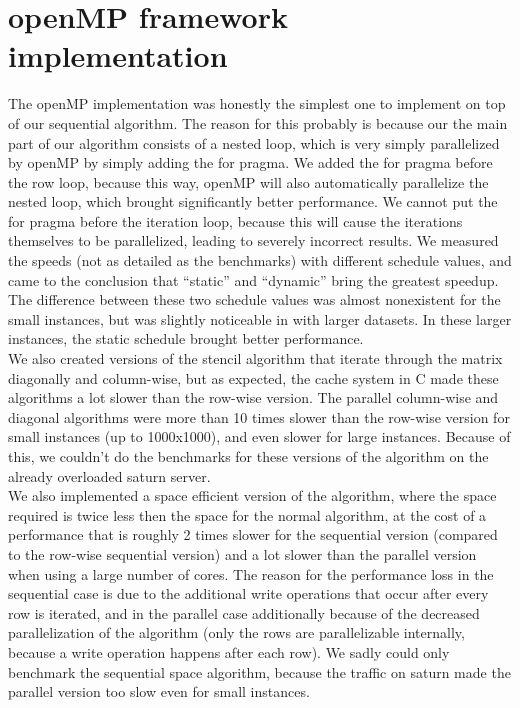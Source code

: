 \documentclass[11pt]{article}
\begin{document}
\section{openMP framework implementation}
The openMP implementation was honestly the simplest one to implement on top of our sequential algorithm. The reason for this probably is because our
the main part of our algorithm consists of a nested loop, which is very simply parallelized by openMP by simply adding the for pragma. We added the for pragma before the 
row loop, because this way, openMP will also automatically parallelize the nested loop, which brought significantly better performance. We cannot put the for pragma before the
iteration loop, because this will cause the iterations themselves to be parallelized, leading to severely incorrect results. We measured the speeds (not as detailed as the benchmarks)
with different schedule values, and came to the conclusion that ``static'' and ``dynamic'' bring the greatest speedup. The difference between these two schedule values
was almost nonexistent for the small instances, but was slightly noticeable in with larger datasets. In these larger instances, the static schedule brought better performance.\\
We also created versions of the stencil algorithm that iterate through the matrix diagonally and column-wise, but as expected, the cache system in C made these algorithms a lot 
slower than the row-wise version. The parallel column-wise and diagonal algorithms were more than 10 times slower than the row-wise version for small instances (up to 1000x1000),
and even slower for large instances. Because of this, we couldn't do the benchmarks for these versions of the algorithm on the already overloaded saturn server.\\
We also implemented a space efficient version of the algorithm, where the space required is twice less then the space for the normal algorithm, at the cost of a performance that is roughly 
2 times slower for the sequential version (compared to the row-wise sequential version) and a lot slower than the parallel version when using a large number of cores. The reason for the performance loss
in the sequential case is due to the additional write operations that occur after every row is iterated, and in the parallel case additionally because of the decreased parallelization of the algorithm (only the rows
are parallelizable internally, because a write operation happens after each row). We sadly could only benchmark the sequential space algorithm, because the traffic on saturn made the parallel version too slow even for small instances.\\
\end{document}
